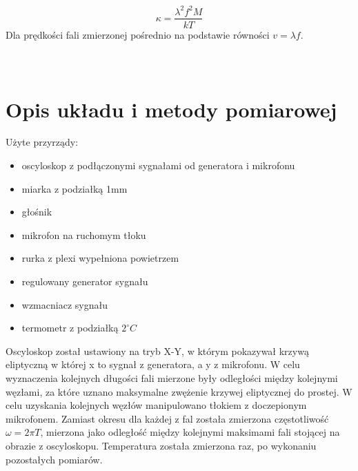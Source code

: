 \documentclass[a4paper,10pt]{article}
\begin{document}
\begin{equation}
  \kappa = \frac{\lambda^2 f^2 M}{kT}
\end{equation}
Dla prędkości fali zmierzonej pośrednio na podstawie równości $v = \lambda f$.
\\\\\\

\section{Opis układu i metody pomiarowej}
Użyte przyrządy:
\begin{itemize}
  \item oscyloskop z podłączonymi sygnałami od generatora i mikrofonu
  \item miarka z podziałką 1mm
  \item głośnik
  \item mikrofon na ruchomym tłoku
  \item rurka z plexi wypełniona powietrzem
  \item regulowany generator sygnału
	\item wzmacniacz sygnału
  \item termometr z podziałką $2^\circ C$
\end{itemize}
Oscyloskop został ustawiony na tryb X-Y, w którym pokazywał krzywą eliptyczną w której x to sygnał z generatora, a y z mikrofonu. W celu wyznaczenia kolejnych długości fali mierzone były
odległości między kolejnymi węzłami, za które uznano maksymalne zwężenie krzywej eliptycznej do prostej. W celu uzyskania kolejnych węzłów manipulowano tłokiem z doczepionym mikrofonem.
Zamiast okresu dla każdej z fal została zmierzona częstotliwość $\omega = 2 \pi T$, mierzona jako odległość między kolejnymi maksimami fali stojącej na
obrazie z oscyloskopu. Temperatura została zmierzona raz, po wykonaniu pozostałych pomiarów.
\end{document}
